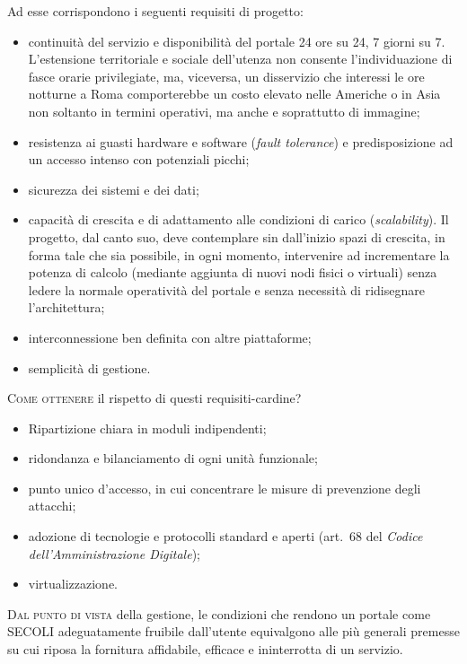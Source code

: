 \documentclass[headinclude,footinclude,a4paper,11pt,final]{scrreprt}
\begin{document}
Ad esse corrispondono i seguenti requisiti di progetto:
\begin{itemize}
\item continuità del servizio e disponibilità del portale 24 ore su 24, 7 giorni su 7.  L'estensione territoriale e sociale dell'utenza non consente l'individuazione di fasce orarie privilegiate, ma, viceversa, un disservizio che interessi le ore notturne a Roma comporterebbe un costo elevato nelle Americhe o in Asia non soltanto in termini operativi, ma anche e soprattutto di immagine;
\item resistenza ai guasti hardware e software (\emph{fault tolerance}) e predisposizione ad un accesso intenso con potenziali picchi;
\item sicurezza dei sistemi e dei dati;
\item capacità di crescita e di adattamento alle condizioni di carico (\emph{scalability}). Il progetto, dal canto suo, deve contemplare sin dall'inizio spazi di crescita, in forma tale che sia possibile, in ogni momento, intervenire ad incrementare la potenza di calcolo (mediante aggiunta di nuovi nodi fisici o virtuali) senza ledere la normale operatività del portale e senza necessità di ridisegnare l'architettura;
\item interconnessione ben definita con altre piattaforme;
\item semplicità di gestione.
\end{itemize}

\bigskip

\lettrine{C}{ome ottenere} il rispetto di questi requisiti-cardine?
\begin{itemize}
\item Ripartizione chiara in moduli indipendenti;
\item ridondanza e bilanciamento di ogni unità funzionale;
\item punto unico d'accesso, in cui concentrare le misure di prevenzione degli attacchi;
\item adozione di tecnologie e protocolli standard e aperti (art.~68 del \emph{Codice dell'Amministrazione Digitale});
\item virtualizzazione.
\end{itemize}

\bigskip

\lettrine{D}{al punto di vista} della gestione, le condizioni che rendono un portale come SECOLI adeguatamente fruibile dall'utente equivalgono alle più generali premesse su cui riposa la fornitura affidabile, efficace e ininterrotta di un servizio.
\end{document}
